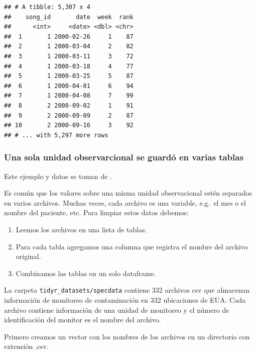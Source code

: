 \documentclass[]{article}
\newenvironment{Shaded}{\begin{snugshade}}{\end{snugshade}}
\newcommand{\KeywordTok}[1]{\textcolor[rgb]{0.13,0.29,0.53}{\textbf{#1}}}
\newcommand{\DataTypeTok}[1]{\textcolor[rgb]{0.13,0.29,0.53}{#1}}
\newcommand{\CharTok}[1]{\textcolor[rgb]{0.31,0.60,0.02}{#1}}
\newcommand{\StringTok}[1]{\textcolor[rgb]{0.31,0.60,0.02}{#1}}
\newcommand{\OtherTok}[1]{\textcolor[rgb]{0.56,0.35,0.01}{#1}}
\newcommand{\OperatorTok}[1]{\textcolor[rgb]{0.81,0.36,0.00}{\textbf{#1}}}
\newcommand{\NormalTok}[1]{#1}
\providecommand{\tightlist}{%
  \setlength{\itemsep}{0pt}\setlength{\parskip}{0pt}}
\begin{document}
\begin{verbatim}
## # A tibble: 5,307 x 4
##    song_id       date  week  rank
##      <int>     <date> <dbl> <chr>
##  1       1 2000-02-26     1    87
##  2       1 2000-03-04     2    82
##  3       1 2000-03-11     3    72
##  4       1 2000-03-18     4    77
##  5       1 2000-03-25     5    87
##  6       1 2000-04-01     6    94
##  7       1 2000-04-08     7    99
##  8       2 2000-09-02     1    91
##  9       2 2000-09-09     2    87
## 10       2 2000-09-16     3    92
## # ... with 5,297 more rows
\end{verbatim}

\subsubsection{Una sola unidad observarcional se guardó en varias
tablas}\label{una-sola-unidad-observarcional-se-guardo-en-varias-tablas}

Este ejemplo y datos se toman de \textcite{tutorialintro}.

Es común que los valores sobre una misma unidad observacional estén
separados en varios archivos. Muchas veces, cada archivo es una
variable, e.g.~el mes o el nombre del paciente, etc. Para limpiar estos
datos debemos:

\begin{enumerate}
\def\labelenumi{\arabic{enumi}.}
\tightlist
\item
  Leemos los archivos en una lista de tablas.
\item
  Para cada tabla agregamos una columna que registra el nombre del
  archivo original.
\item
  Combinamos las tablas en un solo dataframe.
\end{enumerate}

La carpeta \texttt{tidyr\_datasets/specdata} contiene 332 archivos csv
que almacenan información de monitoreo de contaminación en 332
ubicaciones de EUA. Cada archivo contiene información de una unidad de
monitoreo y el número de identificación del monitor es el nombre del
archivo.

Primero creamos un vector con los nombres de los archivos en un
directorio con extensión .csv.

\begin{Shaded}
\end{Shaded}
\end{document}

